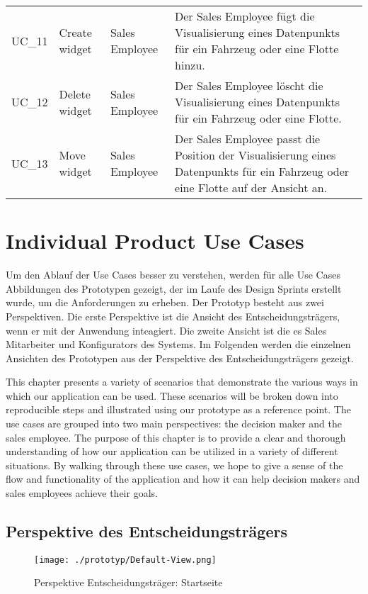 \begin{footnotesize}
\begin{longtable}[i i i L]{ p{} p{} p{} p{} }
    \hypertarget{Ref:UC11}{UC\_11} & Create widget & Sales Employee & Der Sales Employee fügt die Visualisierung eines Datenpunkts für ein Fahrzeug oder eine Flotte hinzu. \\
    \hypertarget{Ref:UC12}{UC\_12} & Delete widget & Sales Employee & Der Sales Employee löscht die Visualisierung eines Datenpunkts für ein Fahrzeug oder eine Flotte. \\
    \hypertarget{Ref:UC13}{UC\_13} & Move widget & Sales Employee & Der Sales Employee passt die Position der Visualisierung eines Datenpunkts für ein Fahrzeug oder eine Flotte auf der Ansicht an. \\
    \bottomrule
  \end{longtable}
\end{footnotesize}
\rmfamily

\section{Individual Product Use Cases}
Um den Ablauf der Use Cases besser zu verstehen, werden für alle Use Cases Abbildungen des Prototypen gezeigt, der im Laufe des Design Sprints erstellt wurde, um die Anforderungen zu erheben. Der Prototyp besteht aus zwei Perspektiven. Die erste Perspektive ist die Ansicht des Entscheidungsträgers, wenn er mit der Anwendung inteagiert. Die zweite Ansicht ist die es Sales Mitarbeiter und Konfigurators des Systems. Im Folgenden werden die einzelnen Ansichten des Prototypen aus der Perspektive des Entscheidungsträgers gezeigt.

This chapter presents a variety of scenarios that demonstrate the various ways in which our application can be used. These scenarios will be broken down into reproducible steps and illustrated using our prototype as a reference point. The use cases are grouped into two main perspectives: the decision maker and the sales employee. The purpose of this chapter is to provide a clear and thorough understanding of how our application can be utilized in a variety of different situations. By walking through these use cases, we hope to give a sense of the flow and functionality of the application and how it can help decision makers and sales employees achieve their goals.


\subsection{Perspektive des Entscheidungsträgers}
\begin{figure}[H]
  \centering
  \texttt{[image: ./prototyp/Default-View.png]}
  \caption{Perspektive Entscheidungsträger: Startseite}
  \label{DecisionMaker:Homepage}
\end{figure}

